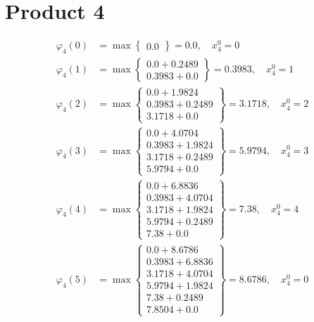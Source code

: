 \documentclass{article}
\begin{document}
\section{Product 4}
\begin{align*}
\varphi_{4}(0) &= \max \left\{ \begin{array}{c}
0.0
\end{array} \right\}=0.0, \quad x_{4}^0=0\\
  
\varphi_{4}(1) &= \max \left\{ \begin{array}{c}
0.0 + 0.2489 \\
 0.3983 + 0.0
\end{array} \right\}=0.3983, \quad x_{4}^0=1\\
  
\varphi_{4}(2) &= \max \left\{ \begin{array}{c}
0.0 + 1.9824 \\
 0.3983 + 0.2489 \\
 3.1718 + 0.0
\end{array} \right\}=3.1718, \quad x_{4}^0=2\\
  
\varphi_{4}(3) &= \max \left\{ \begin{array}{c}
0.0 + 4.0704 \\
 0.3983 + 1.9824 \\
 3.1718 + 0.2489 \\
 5.9794 + 0.0
\end{array} \right\}=5.9794, \quad x_{4}^0=3\\
  
\varphi_{4}(4) &= \max \left\{ \begin{array}{c}
0.0 + 6.8836 \\
 0.3983 + 4.0704 \\
 3.1718 + 1.9824 \\
 5.9794 + 0.2489 \\
 7.38 + 0.0
\end{array} \right\}=7.38, \quad x_{4}^0=4\\
  
\varphi_{4}(5) &= \max \left\{ \begin{array}{c}
0.0 + 8.6786 \\
 0.3983 + 6.8836 \\
 3.1718 + 4.0704 \\
 5.9794 + 1.9824 \\
 7.38 + 0.2489 \\
 7.8504 + 0.0
\end{array} \right\}=8.6786, \quad x_{4}^0=0\\
  

\end{align*}
\end{document}
